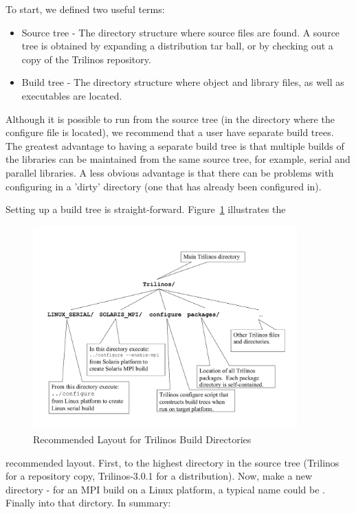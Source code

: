 \documentclass[12pt,relax]{TrilinosDevGuide}
\begin{document}
To start, we defined two useful terms:
\begin{itemize}
\item Source tree - The directory structure where source files are found.  A source 
tree is obtained by expanding a distribution tar ball, or by checking 
out a copy of the Trilinos repository.  
\item Build tree - The directory structure where object and library files, as well 
as executables are located.  
\end{itemize}
 
Although it is possible to run  from the source tree (in 
the directory where the configure file is located), we recommend that a 
user have separate build trees.  The greatest advantage to having a separate 
build tree is that multiple builds of the libraries can be maintained
from the same source tree, for 
example, serial and parallel libraries.  A less obvious advantage is that 
there can be problems with configuring in a 'dirty' directory (one that has 
already been configured in).

	Setting up a build tree is straight-forward.
Figure~\ref{Figure:TrilinosDirectoryStructure} illustrates the
\begin{figure}
\begin{center}
\includegraphics[width=4in,angle=270]{TrilinosDirectoryStructure}
\end{center}
\label{Figure:TrilinosDirectoryStructure}
\caption{Recommended Layout for Trilinos Build Directories}
\end{figure}recommended layout.  First,  to the highest 
directory in the source tree (Trilinos for a repository copy, Trilinos-3.0.1 
for a distribution).  Now, make a new directory - for an MPI build
on a Linux platform, a 
typical name could be .  
Finally  into that dirctory.  In summary:
\end{document}
